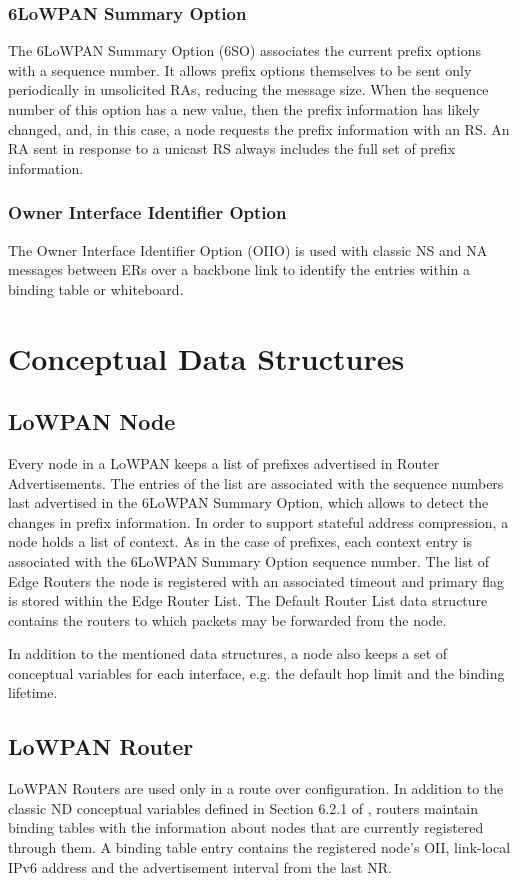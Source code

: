 \subsubsection{6LoWPAN Summary Option}\label{nd.option.summary}
The 6LoWPAN Summary Option (6SO) associates the current prefix options with a sequence number. It allows prefix options themselves to be sent only periodically in unsolicited RAs, reducing the message size. When the sequence number of this option has a new value, then the prefix information has likely changed, and, in this case, a node requests the prefix information with an RS. An RA sent in response to a unicast RS always includes the full set of prefix information.

\subsubsection{Owner Interface Identifier Option}\label{sec:nd.oiio}
The Owner Interface Identifier Option (OIIO) is used with classic NS and NA messages between ERs over a backbone link to identify the entries within a binding table or whiteboard.

\section{Conceptual Data Structures }
\subsection{LoWPAN Node}
Every node in a LoWPAN keeps a list of prefixes advertised in Router Advertisements. The entries of the list are associated with the sequence numbers last advertised in the 6LoWPAN Summary Option, which allows to detect the changes in prefix information. In order to support stateful address compression, a node holds a list of context. As in the case of prefixes, each context entry is associated with the 6LoWPAN Summary Option sequence number. The list of Edge Routers the node is registered with an associated timeout and primary flag is stored within the Edge Router List. 
The Default Router List data structure contains the routers to which packets may be forwarded from the node. 

In addition to the mentioned data structures, a node also keeps a set of conceptual variables for each interface, e.g. the default hop limit and the binding lifetime.

\subsection{LoWPAN Router}
LoWPAN Routers are used only in a route over configuration. In addition to the classic ND conceptual variables defined in Section 6.2.1 of \cite{rfc4861}, routers maintain binding tables with the information about nodes that are currently registered through them. A binding table entry  contains the registered node's OII, link-local IPv6 address and the advertisement interval from the last NR.

